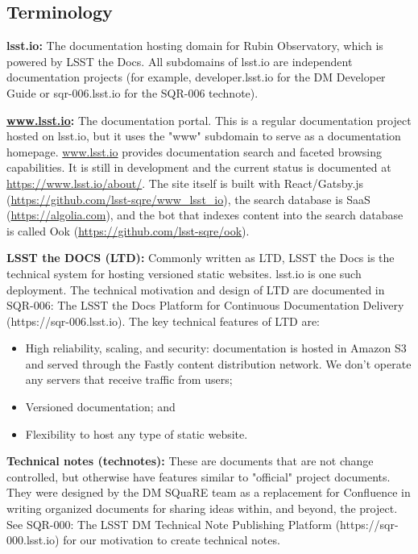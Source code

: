 \subsection{Terminology}

{\bf lsst.io:}  The documentation hosting domain for Rubin Observatory, which is powered by LSST the Docs. All subdomains of lsst.io are independent documentation projects (for example, developer.lsst.io for the DM Developer Guide or sqr-006.lsst.io for the SQR-006 technote).

{\bf \url{www.lsst.io}:}  The documentation portal. This is a regular documentation project hosted on lsst.io, but it uses the "www" subdomain to serve as a documentation homepage. \url{www.lsst.io} provides documentation search and faceted browsing capabilities. It is still in development and the current status is documented at \url{https://www.lsst.io/about/}. The site itself is built with React/Gatsby.js (\url{https://github.com/lsst-sqre/www_lsst_io}), the search database is SaaS (\url{https://algolia.com}), and the bot that indexes content into the search database is called Ook (\url{https://github.com/lsst-sqre/ook}).

{\bf LSST the DOCS (LTD):}  Commonly written as LTD, LSST the Docs is the technical system for hosting versioned static websites. lsst.io is one such deployment. The technical motivation and design of LTD are documented in SQR-006: The LSST the Docs Platform for Continuous Documentation Delivery (https://sqr-006.lsst.io). The key technical features of LTD are:

\begin{itemize}
	\item High reliability, scaling, and security: documentation is hosted in Amazon S3 and served through the Fastly content distribution network. We don't operate any servers that receive traffic from users;
	\item Versioned documentation; and
	\item Flexibility to host any type of static website.
\end{itemize}

{\bf Technical notes (technotes):}  These are documents that are not change controlled, but otherwise have features similar to "official" project documents. They were designed by the DM SQuaRE team as a replacement for Confluence in writing organized documents for sharing ideas within, and beyond, the project. See SQR-000: The LSST DM Technical Note Publishing Platform (https://sqr-000.lsst.io) for our motivation to create technical notes.

